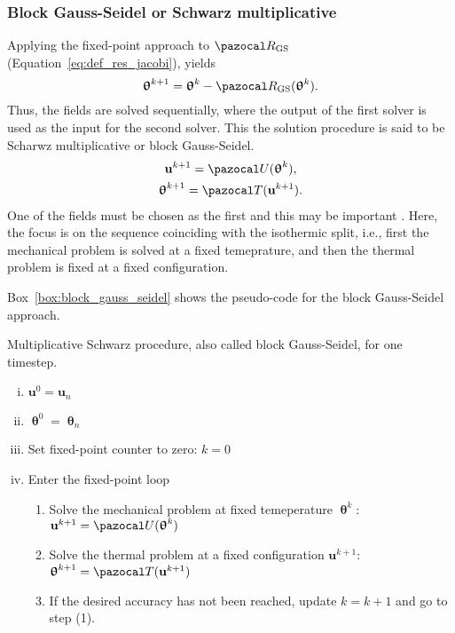 \subsubsection{Block Gauss-Seidel or Schwarz multiplicative}

Applying the fixed-point approach to \(\pazocal R_\mathrm{GS}\) (Equation~\eqref{eq:def_res_jacobi}), yields
\begin{equation}
  \bm\uptheta^{k+1} = \bm\uptheta^k - \pazocal R_\mathrm{GS}(\bm \uptheta^k).
\end{equation}
Thus, the fields are solved sequentially, where the output of the first solver is used as the input for the second solver.
This the solution procedure is said to be Scharwz multiplicative or block Gauss-Seidel.
\begin{gather}
\mathbf u^{k+1}  = \pazocal U(\bm \uptheta^k),\\
\bm \uptheta^{k+1} = \pazocal T(\mathbf u^{k+1}).
\end{gather}
One of the fields must be chosen as the first and this may be important \citep{joosten_analysis_2009}.
Here, the focus is on the sequence coinciding with the isothermic split, i.e., first the mechanical problem is solved at a fixed temeprature, and then the thermal problem is fixed at a fixed configuration.

Box~\ref{box:block_gauss_seidel} shows the pseudo-code for the block Gauss-Seidel approach.

\begin{framedbox}[htb]
  \caption{Multiplicative Schwarz procedure, also called block Gauss-Seidel, for one timestep.}
  \label{box:block_gauss_seidel}
  \begin{center}
    \begin{minipage}{0.9\textwidth}
    \begin{enumerate}[(i)]
    \item \(\mathbf u^0 = \mathbf u_{n}\)
    \item \(\bm \uptheta^0 = \bm \uptheta_n\)
      \item Set fixed-point counter to zero: \(k=0\)
    \item Enter the fixed-point loop
    \begin{enumerate}[(1)]
      \item Solve the mechanical problem at fixed temeperature \(\bm \uptheta^k\): \(\mathbf u^{k+1} = \pazocal U(\bm \uptheta^k)\)
      \item Solve the thermal problem at a fixed configuration \(\mathbf u^{k+1}\): \(\bm \uptheta^{k+1} = \pazocal T(\mathbf u^{k+1})\)
      \item If the desired accuracy has not been reached, update \(k=k+1\) and go to step (1).

    \end{enumerate}
    \end{enumerate}
    \end{minipage}
  \end{center}
\end{framedbox}

